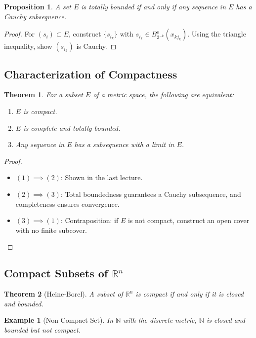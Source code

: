 \documentclass[9pt]{article}
\theoremstyle{definition}
\theoremstyle{plain}
\newtheorem{theorem}{Theorem}
\newtheorem{proposition}{Proposition}
\newtheorem{example}{Example}
\begin{document}
\begin{proposition}
A set \( E \) is totally bounded if and only if any sequence in \( E \) has a Cauchy subsequence.
\end{proposition}

\begin{proof}
For \( (s_i) \subset E \), construct \( \{s_{i_k}\} \) with \( s_{i_k} \in B_{2^{-k}}^o(x_{kj_k}) \). Using the triangle inequality, show \( (s_{i_k}) \) is Cauchy.
\end{proof}

\subsection*{Characterization of Compactness}
\begin{theorem}
For a subset \( E \) of a metric space, the following are equivalent:
\begin{enumerate}
    \item \( E \) is compact.
    \item \( E \) is complete and totally bounded.
    \item Any sequence in \( E \) has a subsequence with a limit in \( E \).
\end{enumerate}
\end{theorem}

\begin{proof}
\leavevmode
\begin{itemize}
    \item \( (1) \implies (2) \): Shown in the last lecture.
    \item \( (2) \implies (3) \): Total boundedness guarantees a Cauchy subsequence, and completeness ensures convergence.
    \item \( (3) \implies (1) \): Contraposition: if \( E \) is not compact, construct an open cover with no finite subcover.
\end{itemize}
\end{proof}

\subsection*{Compact Subsets of \( \mathbb{R}^n \)}
\begin{theorem}[Heine-Borel]
A subset of \( \mathbb{R}^n \) is compact if and only if it is closed and bounded.
\end{theorem}

\begin{example}[Non-Compact Set]
In \( \mathbb{N} \) with the discrete metric, \( \mathbb{N} \) is closed and bounded but not compact.
\end{example}
\end{document}
